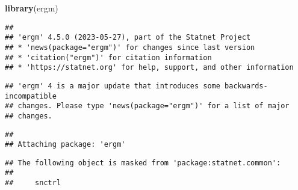 \documentclass[
]{article}
\newenvironment{Shaded}{\begin{snugshade}}{\end{snugshade}}
\newcommand{\FunctionTok}[1]{\textcolor[rgb]{0.13,0.29,0.53}{\textbf{#1}}}
\newcommand{\NormalTok}[1]{#1}
\begin{document}
\begin{Shaded}
\begin{Highlighting}[]
\FunctionTok{library}\NormalTok{(ergm)}
\end{Highlighting}
\end{Shaded}

\begin{verbatim}
## 
## 'ergm' 4.5.0 (2023-05-27), part of the Statnet Project
## * 'news(package="ergm")' for changes since last version
## * 'citation("ergm")' for citation information
## * 'https://statnet.org' for help, support, and other information
\end{verbatim}

\begin{verbatim}
## 'ergm' 4 is a major update that introduces some backwards-incompatible
## changes. Please type 'news(package="ergm")' for a list of major
## changes.
\end{verbatim}

\begin{verbatim}
## 
## Attaching package: 'ergm'
\end{verbatim}

\begin{verbatim}
## The following object is masked from 'package:statnet.common':
## 
##     snctrl
\end{verbatim}
\end{document}
